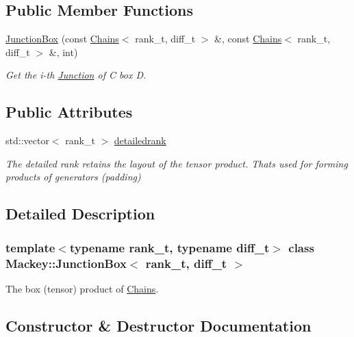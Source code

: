 \subsection*{Public Member Functions}
\begin{DoxyCompactItemize}
\item 
\hyperlink{classMackey_1_1JunctionBox_ad1847b0ee8aaa343521366f2ff85b7bf}{Junction\+Box} (const \hyperlink{classMackey_1_1Chains}{Chains}$<$ rank\+\_\+t, diff\+\_\+t $>$ \&, const \hyperlink{classMackey_1_1Chains}{Chains}$<$ rank\+\_\+t, diff\+\_\+t $>$ \&, int)
\begin{DoxyCompactList}\small\item\em Get the i-\/th \hyperlink{classMackey_1_1Junction}{Junction} of C box D. \end{DoxyCompactList}\end{DoxyCompactItemize}
\subsection*{Public Attributes}
\begin{DoxyCompactItemize}
\item 
std\+::vector$<$ rank\+\_\+t $>$ \hyperlink{classMackey_1_1JunctionBox_ae1bd899e721eebc9b22ccccf506e774e}{detailedrank}
\begin{DoxyCompactList}\small\item\em The detailed rank retains the layout of the tensor product. That\textquotesingle{}s used for forming products of generators (padding) \end{DoxyCompactList}\end{DoxyCompactItemize}


\subsection{Detailed Description}
\subsubsection*{template$<$typename rank\+\_\+t, typename diff\+\_\+t$>$\newline
class Mackey\+::\+Junction\+Box$<$ rank\+\_\+t, diff\+\_\+t $>$}

The box (tensor) product of \hyperlink{classMackey_1_1Chains}{Chains}. 

\subsection{Constructor \& Destructor Documentation}
\mbox{\label{classMackey_1_1JunctionBox_ad1847b0ee8aaa343521366f2ff85b7bf}} 
